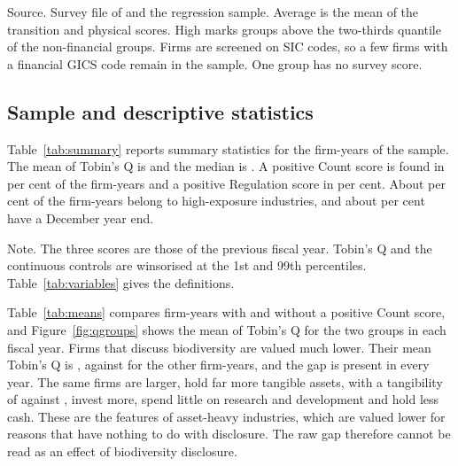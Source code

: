 \documentclass[12pt,a4paper]{article}
\newcommand{\tablenote}[1]{\par\smallskip\begin{minipage}{\linewidth}\footnotesize\setstretch{1.05}#1\end{minipage}}
\newcommand{\widetable}[1]{\resizebox{\ifdim\width>\linewidth\linewidth\else\width\fi}{!}{}}
\begin{document}
\begin{table}[!htbp]
\centering\small
\caption{Survey-based exposure and disclosure by GICS industry group}\label{tab:industry}
\widetable{tables/tab_industry}
\tablenote{Source. Survey file of \citet{giglio2026} and the regression sample. Average is the mean of the transition and physical scores. High marks groups above the two-thirds quantile of the non-financial groups. Firms are screened on SIC codes, so a few firms with a financial GICS code remain in the sample. One group has no survey score.}
\end{table}

\subsection{Sample and descriptive statistics}

Table~\ref{tab:summary} reports summary statistics for the \nFinal{} firm-years of the sample. The mean of Tobin's Q is \meanQ{} and the median is \medianQ{}. A positive Count score is found in \pctCount{} per cent of the firm-years and a positive Regulation score in \pctReg{} per cent. About \pctHigh{} per cent of the firm-years belong to high-exposure industries, and about \pctDecember{} per cent have a December year end.

\begin{table}[!htbp]
\centering\small
\caption{Summary statistics}\label{tab:summary}
\widetable{tables/tab_summary}
\tablenote{Note. The three scores are those of the previous fiscal year. Tobin's Q and the continuous controls are winsorised at the 1st and 99th percentiles. Table~\ref{tab:variables} gives the definitions.}
\end{table}

Table~\ref{tab:means} compares firm-years with and without a positive Count score, and Figure~\ref{fig:qgroups} shows the mean of Tobin's Q for the two groups in each fiscal year. Firms that discuss biodiversity are valued much lower. Their mean Tobin's Q is \meanQOne{}, against \meanQZero{} for the other firm-years, and the gap is present in every year. The same firms are larger, hold far more tangible assets, with a tangibility of \tangOne{} against \tangZero{}, invest more, spend little on research and development and hold less cash. These are the features of asset-heavy industries, which are valued lower for reasons that have nothing to do with disclosure. The raw gap therefore cannot be read as an effect of biodiversity disclosure.
\end{document}
